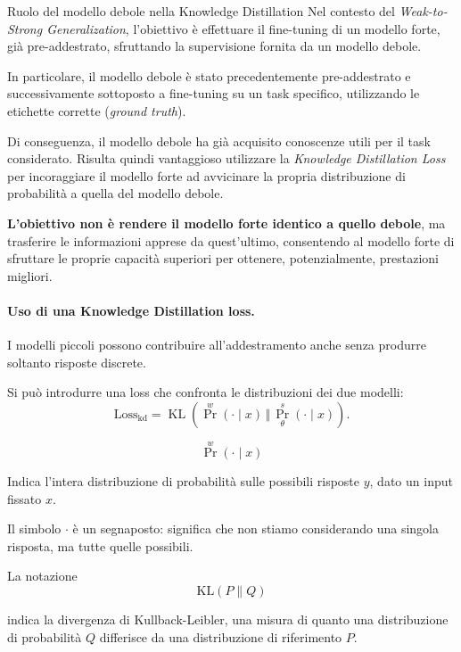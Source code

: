 \begin{observation}{Ruolo del modello debole nella Knowledge Distillation}
    Nel contesto del \textit{Weak-to-Strong Generalization}, l'obiettivo è effettuare il fine-tuning di un modello forte, già pre-addestrato, sfruttando la supervisione fornita da un modello debole.

    In particolare, il modello debole è stato precedentemente pre-addestrato e successivamente sottoposto a fine-tuning su un task specifico, utilizzando le etichette corrette (\textit{ground truth}).


    Di conseguenza, il modello debole ha già acquisito conoscenze utili per il task considerato. Risulta quindi vantaggioso utilizzare la \textit{Knowledge Distillation Loss} per incoraggiare il modello forte ad avvicinare la propria distribuzione di probabilità a quella del modello debole.

    \textbf{L'obiettivo non è rendere il modello forte identico a quello debole}, ma trasferire le informazioni apprese da quest'ultimo, consentendo al modello forte di sfruttare le proprie capacità superiori per ottenere, potenzialmente, prestazioni migliori.
\end{observation}


\paragraph{Uso di una Knowledge Distillation loss.}
I modelli piccoli possono contribuire
all'addestramento anche senza produrre
soltanto risposte discrete.

Si può introdurre una loss che confronta
le distribuzioni dei due modelli:
\[
\mathrm{Loss}_{\mathrm{kd}}
=
\operatorname{KL}
\left(
\Pr^{w}(\cdot\mid x)
\,\Vert\,
\Pr^{s}_{\theta}(\cdot\mid x)
\right).
\tag{4.12}
\]


\[
\Pr^w(\cdot\mid x)
\]

Indica l'intera distribuzione di probabilità sulle possibili risposte \(y\), dato un input fissato $x$.

Il simbolo \(\cdot\) è un segnaposto: significa che non stiamo considerando una singola risposta, ma tutte quelle possibili.

La notazione
\[
\mathrm{KL}(P\|Q)
\]

indica la divergenza di Kullback-Leibler, una misura di quanto una distribuzione di probabilità \(Q\) differisce da una distribuzione di riferimento \(P\).



